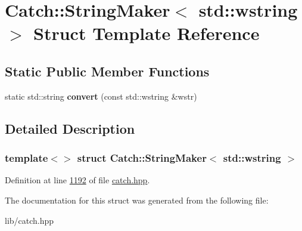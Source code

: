 \hypertarget{structCatch_1_1StringMaker_3_01std_1_1wstring_01_4}{}\section{Catch\+::String\+Maker$<$ std\+::wstring $>$ Struct Template Reference}
\label{structCatch_1_1StringMaker_3_01std_1_1wstring_01_4}
\subsection*{Static Public Member Functions}
\begin{DoxyCompactItemize}
\item 
\mbox{\label{structCatch_1_1StringMaker_3_01std_1_1wstring_01_4_a375d49d6281bee4d36d853fa1bd5ebbd}} 
static std\+::string {\bfseries convert} (const std\+::wstring \&wstr)
\end{DoxyCompactItemize}


\subsection{Detailed Description}
\subsubsection*{template$<$$>$\newline
struct Catch\+::\+String\+Maker$<$ std\+::wstring $>$}



Definition at line \mbox{\hyperlink{catch_8hpp_source_l01192}{1192}} of file \mbox{\hyperlink{catch_8hpp_source}{catch.\+hpp}}.



The documentation for this struct was generated from the following file\+:\begin{DoxyCompactItemize}
\item 
lib/catch.\+hpp\end{DoxyCompactItemize}
